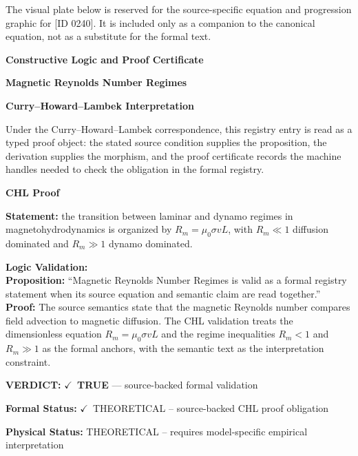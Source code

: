 \begingroup\footnotesize\sloppy
The visual plate below is reserved for the source-specific equation and progression graphic for [ID 0240]. It is included only as a companion to the canonical equation, not as a substitute for the formal text.
\par\endgroup
\ifTZPDarkEdition
{}
\fi

\clearpage
\begingroup\tzpsupportsetup
\noindent\textbf{\fontsize{10.8pt}{12.8pt}\selectfont [ID 0240] Constructive Logic and Proof Certificate}\par
\noindent\textbf{\fontsize{10pt}{12pt}\selectfont Magnetic Reynolds Number Regimes}\par
\vspace{0.45em}
\begingroup
\footnotesize
\setlength{\parskip}{0.22em}
\setlength{\parindent}{0pt}
\noindent\textbf{Curry--Howard--Lambek Interpretation}\par
Under the Curry--Howard--Lambek correspondence, this registry entry is read as a typed proof
object: the stated source condition supplies the proposition, the derivation supplies the
morphism, and the proof certificate records the machine handles needed to check the obligation
in the formal registry.

\vspace{0.45em}
\noindent\textbf{CHL Proof}\par
\textbf{Statement:} the transition between laminar and dynamo regimes in magnetohydrodynamics is
organized by \(R_m=\mu_0\sigma vL\), with \(R_m\ll1\) diffusion dominated and \(R_m\gg1\)
dynamo dominated.

\textbf{Logic Validation:}\\
\textbf{Proposition:} ``Magnetic Reynolds Number Regimes is valid as a formal registry statement when its source
equation and semantic claim are read together.''\\
\textbf{Proof:} The source semantics state that the magnetic Reynolds number compares field
advection to magnetic diffusion. The CHL validation treats the dimensionless equation
\(R_m=\mu_0\sigma vL\) and the regime inequalities \(R_m<1\) and \(R_m\gg1\) as the
formal anchors, with the semantic text as the interpretation constraint.

\textbf{VERDICT:} \ensuremath{\checkmark}\ \textbf{TRUE} --- source-backed formal validation

\textbf{Formal Status:} \ensuremath{\checkmark}\ THEORETICAL -- source-backed CHL proof obligation

\textbf{Physical Status:} THEORETICAL -- requires model-specific empirical interpretation
\par\vspace{0.45em}
\par
\ifTZPDarkEdition
{}
\fi
\endgroup
\endgroup
